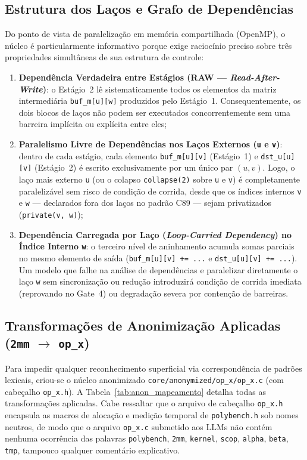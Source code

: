 \subsection{Estrutura dos Laços e Grafo de Dependências}
\label{subsec:anon_dependencias}

Do ponto de vista de paralelização em memória compartilhada (OpenMP), o núcleo é particularmente informativo porque exige raciocínio preciso sobre três propriedades simultâneas de sua estrutura de controle:
\begin{enumerate}
    \item \textbf{Dependência Verdadeira entre Estágios (RAW --- \textit{Read-After-Write})}: o Estágio~2 lê sistematicamente todos os elementos da matriz intermediária \texttt{buf\_m[u][w]} produzidos pelo Estágio~1. Consequentemente, os dois blocos de laços não podem ser executados concorrentemente sem uma barreira implícita ou explícita entre eles;
    \item \textbf{Paralelismo Livre de Dependências nos Laços Externos (\texttt{u} e \texttt{v})}: dentro de cada estágio, cada elemento \texttt{buf\_m[u][v]} (Estágio~1) e \texttt{dst\_u[u][v]} (Estágio~2) é escrito exclusivamente por um único par $(u, v)$. Logo, o laço mais externo \texttt{u} (ou o colapso \texttt{collapse(2)} sobre \texttt{u} e \texttt{v}) é completamente paralelizável sem risco de condição de corrida, desde que os índices internos \texttt{v} e \texttt{w} --- declarados fora dos laços no padrão C89 --- sejam privatizados (\texttt{private(v, w)});
    \item \textbf{Dependência Carregada por Laço (\textit{Loop-Carried Dependency}) no Índice Interno \texttt{w}}: o terceiro nível de aninhamento acumula somas parciais no mesmo elemento de saída (\texttt{buf\_m[u][v] += ...} e \texttt{dst\_u[u][v] += ...}). Um modelo que falhe na análise de dependências e paralelizar diretamente o laço \texttt{w} sem sincronização ou redução introduzirá condição de corrida imediata (reprovando no Gate~4) ou degradação severa por contenção de barreiras.
\end{enumerate}

\subsection{Transformações de Anonimização Aplicadas (\texttt{2mm} $\rightarrow$ \texttt{op\_x})}
\label{subsec:anon_mapeamento}

Para impedir qualquer reconhecimento superficial via correspondência de padrões lexicais, criou-se o núcleo anonimizado \texttt{core/anonymized/op\_x/op\_x.c} (com cabeçalho \texttt{op\_x.h}). A Tabela~\ref{tab:anon_mapeamento} detalha todas as transformações aplicadas. Cabe ressaltar que o arquivo de cabeçalho \texttt{op\_x.h} encapsula as macros de alocação e medição temporal de \texttt{polybench.h} sob nomes neutros, de modo que o arquivo \texttt{op\_x.c} submetido aos LLMs não contém nenhuma ocorrência das palavras \texttt{polybench}, \texttt{2mm}, \texttt{kernel}, \texttt{scop}, \texttt{alpha}, \texttt{beta}, \texttt{tmp}, tampouco qualquer comentário explicativo.

